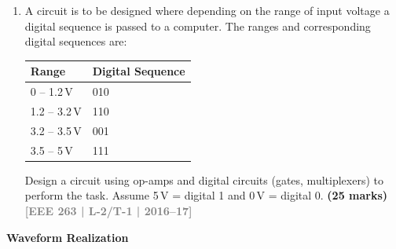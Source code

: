 \documentclass[12pt,a4paper]{article}
\newcommand{\yr}[1]{\hfill\textcolor{gray}{\small\textbf{[#1]}}}
\newcommand{\mk}[1]{\textcolor{orange!70!black}{\small\textbf{(#1 marks)}}}
\newcommand{\subtopic}[2]{%
  \vspace{10pt}
  \noindent\begin{tcolorbox}[colback=#1!8,colframe=#1,boxrule=0.6pt,arc=4pt,
    left=6pt,right=6pt,top=4pt,bottom=4pt]
    \small\bfseries\textcolor{#1}{#2}
  \end{tcolorbox}
  \vspace{2pt}
}
\begin{document}
\begin{enumerate}

\mk{26.67} \yr{EEE 263 | L-2/T-1 | 2017--18}

\item A circuit is to be designed where depending on the range of input voltage a digital sequence is passed to a computer. The ranges and corresponding digital sequences are:
\begin{center}
\begin{tabular}{ll}
\toprule
\textbf{Range} & \textbf{Digital Sequence} \\
\midrule
0 -- 1.2\,V & 010 \\
1.2 -- 3.2\,V & 110 \\
3.2 -- 3.5\,V & 001 \\
3.5 -- 5\,V & 111 \\
\bottomrule
\end{tabular}
\end{center}
Design a circuit using op-amps and digital circuits (gates, multiplexers) to perform the task. Assume 5\,V = digital 1 and 0\,V = digital 0.
\mk{25} \yr{EEE 263 | L-2/T-1 | 2016--17}

\end{enumerate}

\subtopic{cE}{Waveform Realization}
\label{sub:s7-wavereal}
\end{document}
